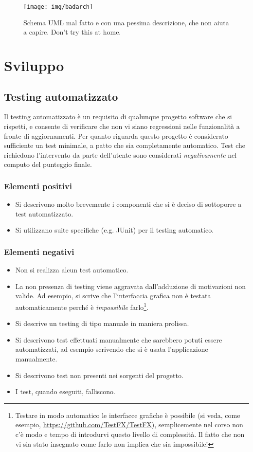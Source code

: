\documentclass[a4paper,12pt]{report}
\begin{document}
\begin{figure}[h]
\centering{}
\texttt{[image: img/badarch]}
\caption{Schema UML mal fatto e con una pessima descrizione, che non aiuta a capire. Don't try this at home.}
\label{img:badarch}
\end{figure}


\chapter{Sviluppo}
\section{Testing automatizzato}

Il testing automatizzato è un requisito di qualunque progetto software che si rispetti, e consente di verificare che non vi siano regressioni nelle funzionalità a fronte di aggiornamenti.
%
Per quanto riguarda questo progetto è considerato sufficiente un test minimale, a patto che sia completamente automatico.
%
Test che richiedono l'intervento da parte dell'utente sono considerati \textit{negativamente} nel computo del punteggio finale.

\subsection*{Elementi positivi}

\begin{itemize}
 \item Si descrivono molto brevemente i componenti che si è deciso di sottoporre a test automatizzato.
 \item Si utilizzano suite specifiche (e.g. JUnit) per il testing automatico.
\end{itemize}

\subsection*{Elementi negativi}
\begin{itemize}
 \item Non si realizza alcun test automatico.
 \item La non presenza di testing viene aggravata dall'adduzione di motivazioni non valide. Ad esempio, si scrive che l'interfaccia grafica non è testata automaticamente perché è \emph{impossibile} farlo\footnote{Testare in modo automatico le interfacce grafiche è possibile (si veda, come esempio, \url{https://github.com/TestFX/TestFX}), semplicemente nel corso non c'è modo e tempo di introdurvi questo livello di complessità. Il fatto che non vi sia stato insegnato come farlo non implica che sia impossibile!}.
 \item Si descrive un testing di tipo manuale in maniera prolissa.
 \item Si descrivono test effettuati manualmente che sarebbero potuti essere automatizzati, ad esempio scrivendo che si è usata l'applicazione manualmente.
 \item Si descrivono test non presenti nei sorgenti del progetto.
 \item I test, quando eseguiti, falliscono.
\end{itemize}
\end{document}
